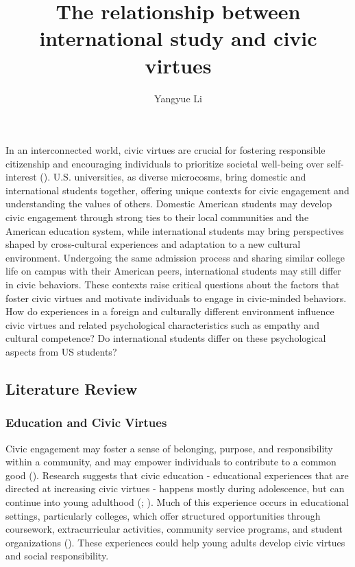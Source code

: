 \documentclass[
  man,
  floatsintext,
  longtable,
  nolmodern,
  notxfonts,
  notimes,
  colorlinks=true,linkcolor=blue,citecolor=blue,urlcolor=blue]{apa7}
\title{The relationship between international study and civic virtues}
\author{Yangyue Li}
\affiliation{
{MA Program in the Social Sciences, University of Chicago}}
\begin{document}
\maketitle


\setcounter{secnumdepth}{-\maxdimen} %

\setlength\LTleft{0pt}


In an interconnected world, civic virtues are crucial for fostering
responsible citizenship and encouraging individuals to prioritize
societal well-being over self-interest
(). U.S. universities, as diverse microcosms, bring domestic
and international students together, offering unique contexts for civic
engagement and understanding the values of others. Domestic American
students may develop civic engagement through strong ties to their local
communities and the American education system, while international
students may bring perspectives shaped by cross-cultural experiences and
adaptation to a new cultural environment. Undergoing the same admission
process and sharing similar college life on campus with their American
peers, international students may still differ in civic behaviors. These
contexts raise critical questions about the factors that foster civic
virtues and motivate individuals to engage in civic-minded behaviors.
How do experiences in a foreign and culturally different environment
influence civic virtues and related psychological characteristics such
as empathy and cultural competence? Do international students differ on
these psychological aspects from US students?

\subsection{Literature Review}\label{literature-review}

\subsubsection{Education and Civic
Virtues}\label{education-and-civic-virtues}

Civic engagement may foster a sense of belonging, purpose, and
responsibility within a community, and may empower individuals to
contribute to a common good
(). Research suggests that civic education - educational
experiences that are directed at increasing civic virtues - happens
mostly during adolescence, but can continue into young adulthood
(;
). Much of this experience occurs in educational settings,
particularly colleges, which offer structured opportunities through
coursework, extracurricular activities, community service programs, and
student organizations
(). These experiences could help young adults develop civic
virtues and social responsibility.
\end{document}
